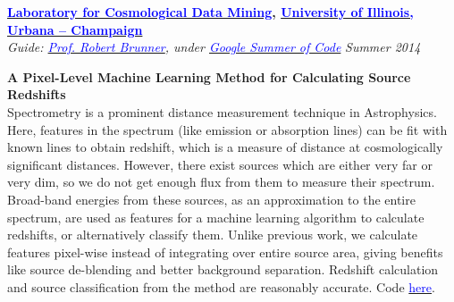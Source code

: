 \documentclass[margin,line]{res}
\newenvironment{list1}{
  \begin{list}{\ding{113}}{%
      \setlength{\itemsep}{0in}
      \setlength{\parsep}{0in} \setlength{\parskip}{0in}
      \setlength{\topsep}{0in} \setlength{\partopsep}{0in} 
      \setlength{\leftmargin}{0.17in}}}{\end{list}}
\begin{document}
\begin{resume}
{\bf \href{http://lcdm.astro.illinois.edu/}{\textcolor{blue} {Laboratory for Cosmological Data Mining}}, \href{http://www.illinois.edu/}{\textcolor{blue}{University of Illinois, Urbana -- Champaign}}} \\
{\em Guide: \href{http://www.astro.illinois.edu/people/bigdog}{\textcolor{blue}{Prof. Robert Brunner}}, under \href{https://www.google-melange.com/gsoc/homepage/google/gsoc2014}{\textcolor{blue} {Google Summer of Code}}} \hfill {\it Summer 2014} \\
\vspace*{-.13in}
\begin{list1}
\item[]\textbf{A Pixel-Level Machine Learning Method for Calculating Source Redshifts} \\
Spectrometry is a prominent distance measurement technique in Astrophysics. Here, features in the spectrum (like emission or absorption lines) can be fit with known lines to obtain redshift, which is a measure of distance at cosmologically significant distances. However, there exist sources which are either very far or very dim, so we do not get enough flux from them to measure their spectrum. Broad-band energies from these sources, as an approximation to the entire spectrum, are used as features for a machine learning algorithm to calculate redshifts, or alternatively classify them. Unlike previous work, we calculate features pixel-wise instead of integrating over entire source area, giving benefits like source de-blending and better background separation. Redshift calculation and source classification from the method are reasonably accurate. Code \href{https://github.com/alankarkotwal/image-photo-z/}{\textcolor{blue} {here}}.
\end{list1}


\end{resume}
\end{document}
